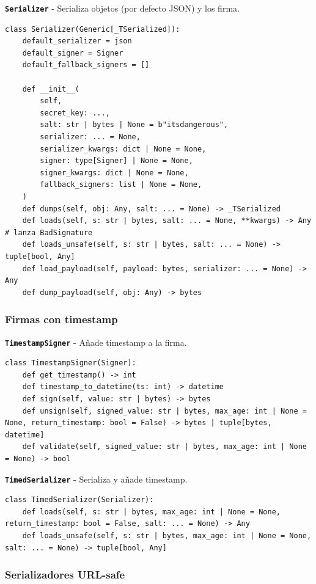 \documentclass[11pt,a4paper]{article}
\begin{document}
\textbf{\texttt{Serializer}} - Serializa objetos (por defecto JSON) y los firma.


\begin{lstlisting}
class Serializer(Generic[_TSerialized]):
    default_serializer = json
    default_signer = Signer
    default_fallback_signers = []

    def __init__(
        self,
        secret_key: ...,
        salt: str | bytes | None = b"itsdangerous",
        serializer: ... = None,
        serializer_kwargs: dict | None = None,
        signer: type[Signer] | None = None,
        signer_kwargs: dict | None = None,
        fallback_signers: list | None = None,
    )
    def dumps(self, obj: Any, salt: ... = None) -> _TSerialized
    def loads(self, s: str | bytes, salt: ... = None, **kwargs) -> Any  # lanza BadSignature
    def loads_unsafe(self, s: str | bytes, salt: ... = None) -> tuple[bool, Any]
    def load_payload(self, payload: bytes, serializer: ... = None) -> Any
    def dump_payload(self, obj: Any) -> bytes
\end{lstlisting}


\subsubsection*{Firmas con timestamp}


\textbf{\texttt{TimestampSigner}} - Añade timestamp a la firma.


\begin{lstlisting}
class TimestampSigner(Signer):
    def get_timestamp() -> int
    def timestamp_to_datetime(ts: int) -> datetime
    def sign(self, value: str | bytes) -> bytes
    def unsign(self, signed_value: str | bytes, max_age: int | None = None, return_timestamp: bool = False) -> bytes | tuple[bytes, datetime]
    def validate(self, signed_value: str | bytes, max_age: int | None = None) -> bool
\end{lstlisting}


\textbf{\texttt{TimedSerializer}} - Serializa y añade timestamp.


\begin{lstlisting}
class TimedSerializer(Serializer):
    def loads(self, s: str | bytes, max_age: int | None = None, return_timestamp: bool = False, salt: ... = None) -> Any
    def loads_unsafe(self, s: str | bytes, max_age: int | None = None, salt: ... = None) -> tuple[bool, Any]
\end{lstlisting}


\subsubsection*{Serializadores URL-safe}
\end{document}
